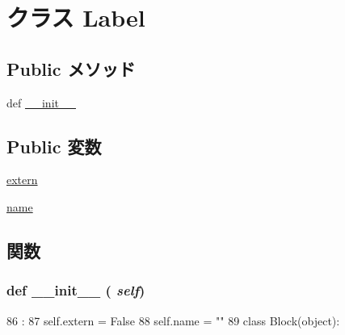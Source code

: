 \hypertarget{classmicro__asm_1_1Label}{
\section{クラス Label}
\label{classmicro__asm_1_1Label}
}
\subsection*{Public メソッド}
\begin{DoxyCompactItemize}
\item 
def \hyperlink{classmicro__asm_1_1Label_ac775ee34451fdfa742b318538164070e}{\_\-\_\-init\_\-\_\-}
\end{DoxyCompactItemize}
\subsection*{Public 変数}
\begin{DoxyCompactItemize}
\item 
\hyperlink{classmicro__asm_1_1Label_a805ea2c810958885998ce5aed1266138}{extern}
\item 
\hyperlink{classmicro__asm_1_1Label_ab74e6bf80237ddc4109968cedc58c151}{name}
\end{DoxyCompactItemize}


\subsection{関数}
\hypertarget{classmicro__asm_1_1Label_ac775ee34451fdfa742b318538164070e}{
\subsubsection[{\_\-\_\-init\_\-\_\-}]{\setlength{\rightskip}{0pt plus 5cm}def \_\-\_\-init\_\-\_\- ( {\em self})}}
\label{classmicro__asm_1_1Label_ac775ee34451fdfa742b318538164070e}



\begin{DoxyCode}
86                       :
87         self.extern = False
88         self.name = ""
89 
class Block(object):
\end{DoxyCode}


